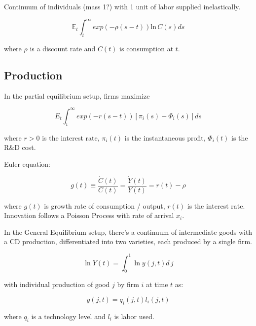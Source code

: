 \documentclass[11pt]{article}
\begin{document}
  Continuum of individuals (mass 1?) with 1 unit of labor supplied inelastically.

  \begin{equation}
    \mathbb{E}_t \int_t^\infty exp(-\rho(s - t))\mathrm{ln}\,   C(s)ds
  \end{equation}

  where $\rho$ is a discount rate and $C(t)$ is consumption at $t$.

\subsection{Production}
\label{sub:production}

  In the partial equilibrium setup, firms maximize

  \begin{equation}
    E_t \int_t^\infty exp(-r(s - t))[\pi_i(s) - \Phi_i(s)]ds
  \end{equation}

  where $r > 0$ is the interest rate, $\pi_i(t)$ is the instantaneous profit, $\Phi_i(t)$ is the R\&D cost.

  Euler equation:

  \begin{equation}
    g(t) \equiv \frac{\dot{C}(t)}{C(t)} = \frac{\dot{Y}(t)}{Y(t)} = r(t) - \rho
  \end{equation}

  where $g(t)$ is growth rate of consumption / output, $r(t)$ is the interest rate.
  Innovation follows a Poisson Process with rate of arrival $x_i$.

  In the General Equilibrium setup, there's a continuum of intermediate goods with a CD production, differentiated into two varieties, each produced by a single firm.

  \begin{equation}
    \ln Y(t) = \int_{0}^{1} \ln y(j, t) d\,j 
  \end{equation}

  with individual production of good $j$ by firm $i$ at time $t$ as:

  \begin{equation}
    y(j, t) = q_i(j, t)l_i(j, t)
  \end{equation}

  where $q_i$ is a technology level and $l_i$ is labor used.
\end{document}
